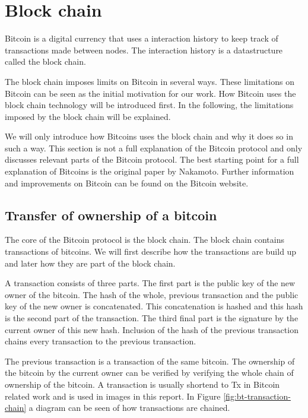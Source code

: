\section{Block chain}
\label{sect:bitcoin}
Bitcoin is a digital currency that uses a interaction history
to keep track of transactions made between nodes.
The interaction history is a datastructure called the block chain.

The block chain imposes limits on Bitcoin in several ways.
These limitations on Bitcoin can be seen as the initial motivation for our work.
How Bitcoin uses the block chain technology will be introduced first.
In the following, the limitations imposed by the block chain will be explained.

We will only introduce how Bitcoins uses the block chain and why it does so in such a way.
This section is not a full explanation of the Bitcoin protocol
and only discusses relevant parts of the Bitcoin protocol.
The best starting point for a full explanation of Bitcoins
is the original paper by Nakamoto\cite{Nakamoto-bitcoin}.
Further information and improvements on Bitcoin can be found on the Bitcoin website\cite{Bitcoin.org-site}.

\subsection{Transfer of ownership of a bitcoin}
The core of the Bitcoin protocol is the block chain.
The block chain contains transactions of bitcoins.
We will first describe how the transactions are build up
and later how they are part of the block chain.

A transaction consists of three parts.
The first part is the public key of the new owner of the bitcoin.
The hash of the whole, previous transaction and the public key of the new owner is concatenated.
This concatenation is hashed and this hash is the second part of the transaction.
The third final part is the signature by the current owner of this new hash.
Inclusion of the hash of the previous transaction chains every transaction to the previous transaction.

The previous transaction is a transaction of the same bitcoin.
The ownership of the bitcoin by the current owner can be verified
by verifying the whole chain of ownership of the bitcoin.
A transaction is usually shortend to Tx in Bitcoin related work and is used in images in this report.
In Figure \ref{fig:bt-transaction-chain} a diagram can be seen of how transactions are chained.

